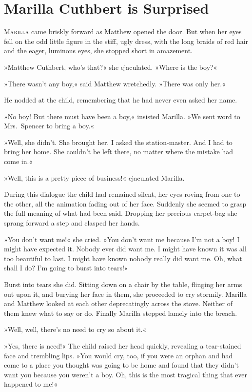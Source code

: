 \chapter{Marilla Cuthbert is Surprised}

\lettrine[lines=4]{M}{arilla} came briskly forward as Matthew opened the door. But when her eyes fell on the odd little figure in the stiff, ugly dress, with the long braids of red hair and the eager, luminous eyes, she stopped short in amazement.

»Matthew Cuthbert, who's that?« she ejaculated. »Where is the boy?«

»There wasn't any boy,« said Matthew wretchedly. »There was only her.«

He nodded at the child, remembering that he had never even asked her name.

»No boy! But there must have been a boy,« insisted Marilla. »We sent word to Mrs.~Spencer to bring a boy.«

»Well, she didn't. She brought her. I asked the station-master. And I had to bring her home. She couldn't be left there, no matter where the mistake had come in.«

»Well, this is a pretty piece of business!« ejaculated Marilla.

During this dialogue the child had remained silent, her eyes roving from one to the other, all the animation fading out of her face. Suddenly she seemed to grasp the full meaning of what had been said. Dropping her precious carpet-bag she sprang forward a step and clasped her hands.

»You don't want me!« she cried. »You don't want me because I'm not a boy! I might have expected it. Nobody ever did want me. I might have known it was all too beautiful to last. I might have known nobody really did want me. Oh, what shall I do? I'm going to burst into tears!«

Burst into tears she did. Sitting down on a chair by the table, flinging her arms out upon it, and burying her face in them, she proceeded to cry stormily. Marilla and Matthew looked at each other deprecatingly across the stove. Neither of them knew what to say or do. Finally Marilla stepped lamely into the breach.

»Well, well, there's no need to cry so about it.«

»Yes, there is need!« The child raised her head quickly, revealing a tear-stained face and trembling lips. »You would cry, too, if you were an orphan and had come to a place you thought was going to be home and found that they didn't want you because you weren't a boy. Oh, this is the most tragical thing that ever happened to me!«

